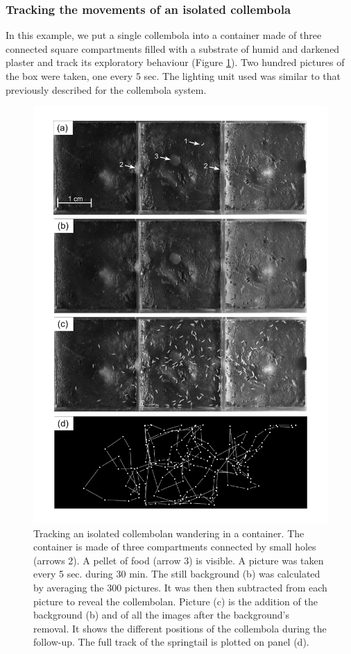 \subsubsection{Tracking the movements of an isolated collembola}

In this example, we put a single collembola into a container made of three
connected square compartments filled with a substrate of humid and darkened
plaster and track its exploratory behaviour (Figure \ref{Fig21-4}). Two hundred pictures of
the box were taken, one every 5 sec. The lighting unit used was similar to that
previously described for the collembola system.

\begin{figure}[!h] %
\centering
\includegraphics[height=0.75\textheight]{2_Methodo/Fig/4_TrackCollemboles.pdf}
\caption[ Tracking an isolated collembolan wandering in a container]{ Tracking an isolated collembolan wandering in a container. The container is made of three compartments connected by small holes (arrows 2). A
pellet of food (arrow 3) is visible. A picture was taken every 5 sec. during 30
min. The still background (b) was calculated by averaging the 300 pictures. It
was then then subtracted from each picture to reveal the collembolan. Picture
(c) is the addition of the background (b) and of all the images after the
background's removal. It shows the different positions of the collembola during
the follow-up. The full track of the springtail is plotted on panel (d).}
\label{Fig21-4}
\end{figure}

